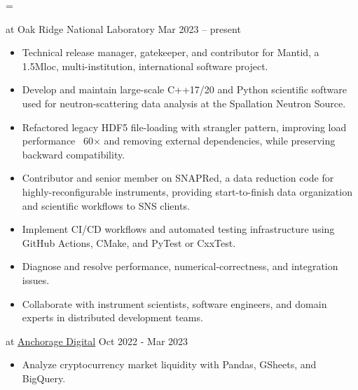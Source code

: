 \documentclass[11pt]{article}
\begin{document}
\begin{list}{}{
  \leftmargin=5pt
  \itemindent=\leftmargin
}
	\item[\bf Scientific Software Engineer] at Oak Ridge National Laboratory 
	\hfill {Mar 2023 -- present~}
	\begin{itemize}
		\item Technical release manager, gatekeeper, and contributor for Mantid, a 1.5Mloc, multi-institution, international software project.
		\item Develop and maintain large-scale C++17/20 and Python scientific software used for neutron-scattering data analysis at the Spallation Neutron Source.
		\item Refactored legacy HDF5 file-loading with strangler pattern, improving load performance ~60$\times$ and removing external dependencies, while preserving backward compatibility.
		\item Contributor and senior member on SNAPRed, a data reduction code for highly-reconfigurable instruments, providing start-to-finish data organization and scientific workflows to SNS clients.
		\item Implement CI/CD workflows and automated testing infrastructure using GitHub Actions, CMake, and PyTest or CxxTest.
		\item Diagnose and resolve performance, numerical-correctness, and integration issues.
		\item Collaborate with instrument scientists, software engineers, and domain experts in distributed development teams.
	\end{itemize}
	\vspace{-0.5\baselineskip}

	\item[\bf Quant Researcher] at \href{https://www.anchorage.com}{Anchorage Digital} 
	\hfill {Oct 2022 - Mar 2023}
	\begin{itemize}
   \item Analyze cryptocurrency market liquidity with Pandas, GSheets, and BigQuery.
  \end{itemize}
	\vspace{-0.5\baselineskip}


\end{list}
\end{document}
